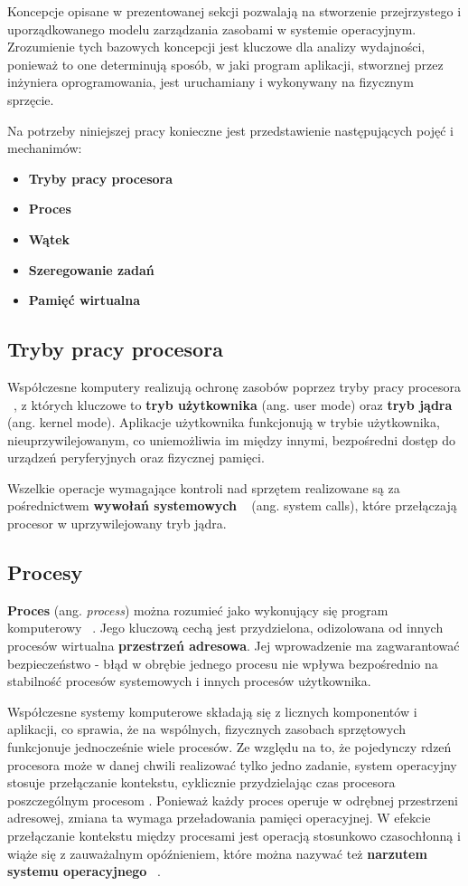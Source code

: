 Koncepcje opisane w prezentowanej sekcji pozwalają na stworzenie przejrzystego i uporządkowanego modelu zarządzania zasobami w systemie operacyjnym. 
Zrozumienie tych bazowych koncepcji jest kluczowe dla analizy wydajności, ponieważ to one determinują sposób, w jaki program aplikacji, stworznej przez inżyniera oprogramowania, jest uruchamiany i wykonywany na fizycznym sprzęcie.

Na potrzeby niniejszej pracy konieczne jest przedstawienie następujących pojęć i mechanimów:
\begin{itemize}
    \item  \textbf{Tryby pracy procesora}
    \item \textbf{Proces}
    \item  \textbf{Wątek}
    \item \textbf{Szeregowanie zadań}
    \item \textbf{Pamięć wirtualna}
\end{itemize}
\subsection{Tryby pracy procesora}
Współczesne komputery realizują ochronę zasobów poprzez tryby pracy procesora ~\cite{Abraham_Silberschatz}, z których kluczowe to \textbf{tryb użytkownika} (ang. user mode) oraz \textbf{tryb jądra} (ang. kernel mode). Aplikacje użytkownika funkcjonują w trybie użytkownika, nieuprzywilejowanym, co uniemożliwia im między innymi, bezpośredni dostęp do urządzeń peryferyjnych oraz fizycznej pamięci.

Wszelkie operacje wymagające kontroli nad sprzętem realizowane są za pośrednictwem \textbf{wywołań systemowych} ~\cite{Abraham_Silberschatz} (ang. system calls), które przełączają procesor w uprzywilejowany tryb jądra.

\subsection{Procesy}
\textbf{Proces} (ang. \textit{process}) można rozumieć jako wykonujący się program komputerowy ~\cite{Abraham_Silberschatz}. Jego kluczową cechą jest przydzielona, odizolowana od innych procesów wirtualna \textbf{przestrzeń adresowa}.
Jej wprowadzenie ma zagwarantować bezpieczeństwo - błąd w obrębie jednego procesu nie wpływa bezpośrednio na stabilność procesów systemowych i innych procesów użytkownika.  

Współczesne systemy komputerowe składają się z licznych komponentów i aplikacji, co sprawia, że na wspólnych, fizycznych zasobach sprzętowych funkcjonuje jednocześnie wiele procesów. 
Ze względu na to, że pojedynczy rdzeń procesora może w danej chwili realizować tylko jedno zadanie, system operacyjny stosuje przełączanie kontekstu, cyklicznie przydzielając czas procesora poszczególnym procesom \cite{Tanenbaum}.
Ponieważ każdy proces operuje w odrębnej przestrzeni adresowej, zmiana ta wymaga przeładowania pamięci operacyjnej. 
W efekcie przełączanie kontekstu między procesami jest operacją stosunkowo czasochłonną i wiąże się z zauważalnym opóźnieniem, które można nazywać też \textbf{narzutem systemu operacyjnego} ~\cite{Tanenbaum}.

